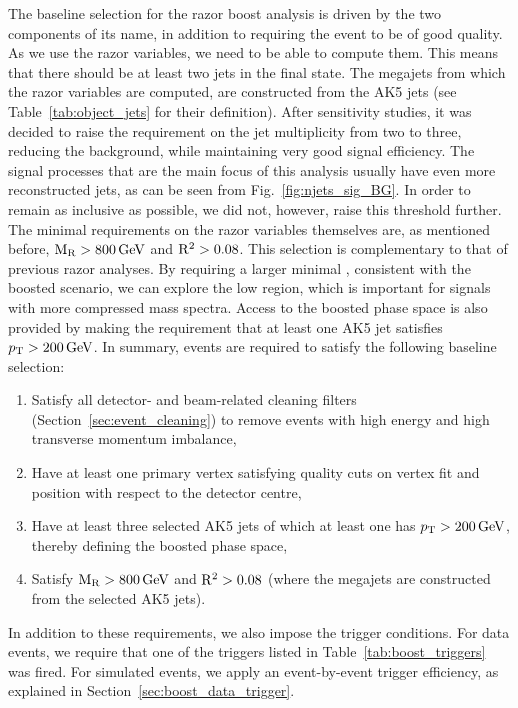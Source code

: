 
The baseline selection for the razor boost analysis is driven by the two components of its name, in
addition to requiring the event to be of good quality.
As we use the razor variables, we need to be able to compute them. This means that there should be
at least two jets in the final state. The megajets from which the razor variables are computed, are
constructed from the AK5 jets (see Table~\ref{tab:object_jets} for their definition).  
After sensitivity studies, it was decided to raise the requirement on the jet multiplicity from two
to three, reducing the background, while maintaining very good signal efficiency. The signal
processes that are the main focus of this analysis usually have even more reconstructed jets, as
can be seen from Fig.~\ref{fig:njets_sig_BG}. In order to remain as inclusive as possible, we did
not, however, raise this threshold further.
The minimal requirements on the razor variables themselves are, as mentioned before, $\mathrm{M_R} > 800\,\text{Ge\hspace{-.08em}V}$
and $\mathrm{R^2} > 0.08$.
This selection is complementary to that of previous razor analyses. By requiring a larger
minimal \mr, consistent with the boosted scenario, we can explore the low \rsq region, which is
important for signals with more compressed mass spectra.
Access to the boosted phase space is also provided by making the requirement that at least one AK5
jet satisfies $p_{\mathrm{T}} > 200\,\text{Ge\hspace{-.08em}V}$.
In summary, events are required to satisfy the following baseline selection:
\begin{enumerate}
 \item Satisfy all detector- and beam-related cleaning filters (Section~\ref{sec:event_cleaning}) to
remove events with high energy and high transverse momentum imbalance,
 \item Have at least one primary vertex satisfying quality cuts on vertex fit and position with
respect to the detector centre,
 \item Have at least three selected AK5 jets of which at least one has  $p_{\mathrm{T}} > 200\,\text{Ge\hspace{-.08em}V}$, thereby
 defining the boosted phase space,
 \item Satisfy $\mathrm{M_R} > 800\,\text{Ge\hspace{-.08em}V}$ and $\mathrm{R^2} > 0.08$ (where the megajets are
constructed from the selected AK5 jets).
\end{enumerate}
In addition to these requirements, we also impose the trigger conditions. 
For data events, we require that one of the triggers listed in Table~\ref{tab:boost_triggers} was
fired. 
For simulated events, we apply an event-by-event trigger efficiency, as explained in
Section~\ref{sec:boost_data_trigger}. 

